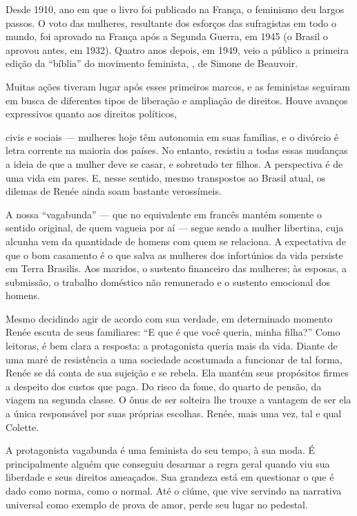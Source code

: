 \begin{multicols}{2}
Desde 1910, ano em que o livro foi publicado na França, o feminismo deu largos passos. O voto das mulheres, resultante dos esforços das sufragistas em todo o mundo, foi aprovado na França após a Segunda Guerra, em 1945 (o Brasil o aprovou antes, em 1932). Quatro anos depois, em 1949, veio a público a primeira edição da “bíblia” do movimento feminista, {}, de Simone de Beauvoir.

Muitas ações tiveram lugar após esses primeiros marcos, e as feministas seguiram em busca de diferentes tipos de liberação e ampliação de direitos. Houve avanços expressivos quanto aos direitos políticos, \begin{figure}\end{figure}civis e sociais --- mulheres hoje têm autonomia em suas famílias, e o divórcio é letra corrente na maioria dos países. No entanto, resistiu a todas essas mudanças a ideia de que a mulher deve se casar, e sobretudo ter filhos. A perspectiva é de uma vida em pares. E, nesse sentido, mesmo transpostos ao Brasil atual, os dilemas de Renée ainda soam bastante verossímeis. 

A nossa “vagabunda” --- que no equivalente em francês {} mantém somente o sentido original, de quem vagueia por aí --- segue sendo a mulher libertina, cuja alcunha vem da quantidade de homens com quem se relaciona. A expectativa de que o bom casamento é o que salva as mulheres dos infortúnios da vida persiste em Terra Brasilis. Aos maridos, o sustento financeiro das mulheres; às esposas, a submissão, o trabalho doméstico não remunerado e o sustento emocional dos homens.

Mesmo decidindo agir de acordo com sua verdade, em determinado momento Renée escuta de seus familiares: “E que é que você queria, minha filha?” Como leitoras, é bem clara a resposta: a protagonista queria mais da vida. Diante de uma maré de resistência a uma sociedade acostumada a funcionar de tal forma, Renée se dá conta de sua sujeição e se rebela. Ela mantém seus propósitos firmes a despeito dos custos que paga. Do risco da fome, do quarto de pensão, da viagem na segunda classe. O ônus de ser solteira lhe trouxe a vantagem de ser ela a única responsável por suas próprias escolhas. Renée, mais uma vez, tal e qual Colette. 

A protagonista vagabunda é uma feminista do seu tempo, à sua moda. É principalmente alguém que conseguiu desarmar a regra geral quando viu sua liberdade e seus direitos ameaçados. Sua grandeza está em questionar o que é dado como norma, como o normal. Até o ciúme, que vive servindo na narrativa universal como exemplo de prova de amor, perde seu lugar no pedestal. 


\end{multicols}
